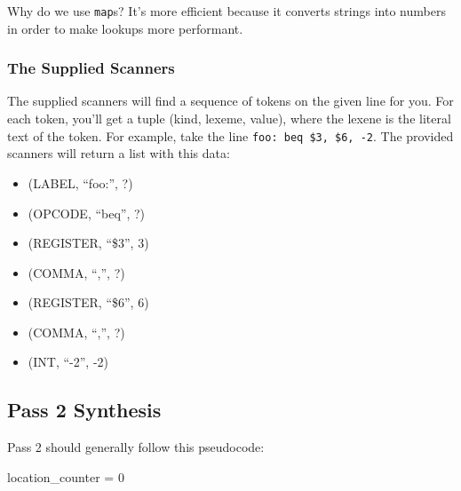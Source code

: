 \documentclass[]{article}
\theoremstyle{definition}
\begin{document}
					Why do we use \verb+map+s? It's more efficient because it converts strings into numbers in order to make lookups more performant.

			\subsubsection{The Supplied Scanners}
			The supplied scanners will find a sequence of tokens on the given line for you. For each token, you'll get a tuple (kind, lexeme, value), where the lexene is the literal text of the token. For example, take the line \verb+foo: beq $3, $6, -2+. The provided scanners will return a list with this data:
			\begin{itemize}
				\item (LABEL, ``foo:'', ?)
				\item (OPCODE, ``beq'', ?)
				\item (REGISTER, ``\$3'', 3)
				\item (COMMA, ``,'', ?)
				\item (REGISTER, ``\$6'', 6)
				\item (COMMA, ``,'', ?)
				\item (INT, ``-2'', -2)
			\end{itemize}
		\subsection{Pass 2 \textendash{} Synthesis}
			Pass 2 should generally follow this pseudocode:
			\begin{algorithm}
				location\_counter = 0\;
			\end{algorithm}
\end{document}
